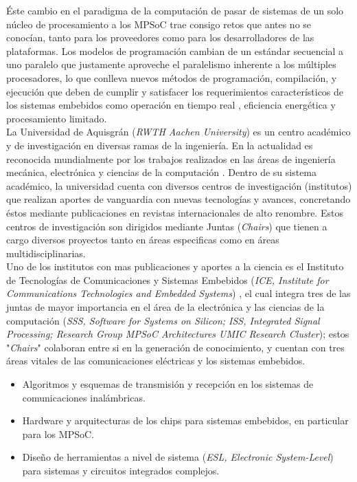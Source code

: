 Éste cambio en el paradigma de la computación de pasar de sistemas de un solo núcleo de procesamiento a los MPSoC trae consigo retos 
que antes no se conocían, tanto para los proveedores como para los desarrolladores de las plataformas. Los modelos de programación cambian 
de un estándar secuencial a uno paralelo que justamente aproveche el paralelismo inherente a los múltiples procesadores,
lo que conlleva nuevos métodos de programación, compilación, y ejecución que deben de cumplir y satisfacer los requerimientos 
característicos de los sistemas embebidos como operación en tiempo real \cite{LERTA_RT}, eficiencia energética y procesamiento limitado.\\

La Universidad de Aquisgrán (\textit{RWTH Aachen University}) es un centro académico y de investigación en diversas
ramas de la ingeniería. En la actualidad es reconocida mundialmente por los trabajos realizados en las áreas de ingeniería mecánica, 
electrónica y ciencias de la computación \cite{RWTH_AACHEN_REF}. Dentro de su sistema académico, la universidad cuenta con diversos centros
de investigación (institutos) que realizan aportes de vanguardia con nuevas tecnologías y avances, concretando éstos mediante publicaciones en revistas
internacionales de alto renombre. Estos centros de investigación son dirigidos mediante Juntas (\textit{Chairs}) 
que tienen a cargo diversos proyectos tanto en áreas especificas como en áreas multidisciplinarias.\\

Uno de los institutos con mas publicaciones y aportes a la ciencia es el Instituto de Tecnologías de Comunicaciones y 
Sistemas Embebidos (\textit{ICE, Institute for Communications Technologies and Embedded Systems}) \cite{ICE_ABOUT}, 
el cual integra tres de las juntas de mayor importancia en el área de la electrónica y las ciencias 
de la computación (\textit{SSS, Software for Systems on Silicon; ISS, Integrated Signal Processing; Research Group 
MPSoC Architectures UMIC Research Cluster}); estos "\textit{Chairs}" colaboran entre si en la generación de conocimiento, y cuentan con 
tres áreas vitales de las comunicaciones eléctricas y los sistemas embebidos. 

\begin{itemize}
 \item Algoritmos y esquemas de transmisión y recepción en los sistemas de comunicaciones inalámbricas.
 \item Hardware y arquitecturas de los chips para sistemas embebidos, en particular para los MPSoC.
 \item Diseño de herramientas a nivel de sistema (\textit{ESL, Electronic System-Level}) para sistemas y circuitos integrados complejos.
\end{itemize}

